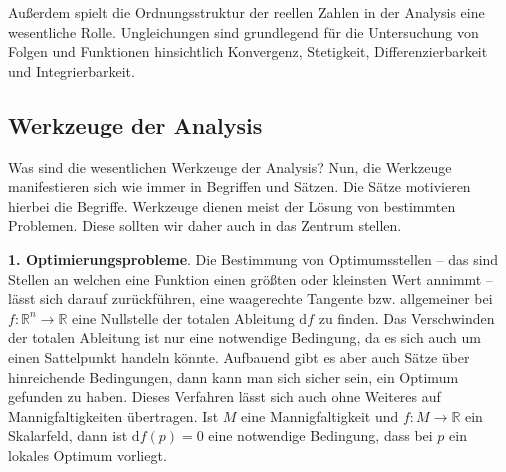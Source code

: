 \documentclass[a4paper,10pt,fleqn,twocolumn,twoside]{scrartcl}
\newcommand{\R}{\mathbb R}
\newcommand{\strong}[1]{\textsf{\textbf{#1}}}
\begin{document}
Außerdem spielt die Ordnungsstruktur der reellen Zahlen in der
Analysis eine wesentliche Rolle. Ungleichungen sind grundlegend
für die Untersuchung von Folgen und Funktionen hinsichtlich
Konvergenz, Stetigkeit, Differenzierbarkeit und Integrierbarkeit.

\subsection{Werkzeuge der Analysis}

Was sind die wesentlichen Werkzeuge der Analysis? Nun, die Werkzeuge
manifestieren sich wie immer in Begriffen und Sätzen. Die Sätze
motivieren hierbei die Begriffe. Werkzeuge dienen meist der Lösung
von bestimmten Problemen. Diese sollten wir daher auch in das Zentrum
stellen.

\strong{1. Optimierungsprobleme}. Die Bestimmung von Optimumsstellen
-- das sind Stellen an welchen eine Funktion einen größten oder
kleinsten Wert annimmt -- lässt sich darauf zurückführen, eine
waagerechte Tangente bzw. allgemeiner bei $f\colon\R^n\to\R$ eine
Nullstelle der totalen Ableitung $\mathrm df$ zu finden. Das
Verschwinden der totalen Ableitung ist nur eine notwendige Bedingung,
da es sich auch um einen Sattelpunkt handeln könnte. Aufbauend
gibt es aber auch Sätze über hinreichende Bedingungen, dann kann man
sich sicher sein, ein Optimum gefunden zu haben. Dieses Verfahren
lässt sich auch ohne Weiteres auf Mannigfaltigkeiten übertragen.
Ist $M$ eine Mannigfaltigkeit und $f\colon M\to\R$ ein Skalarfeld,
dann ist $\mathrm df(p)=0$ eine notwendige Bedingung, dass bei $p$
ein lokales Optimum vorliegt.
\end{document}
